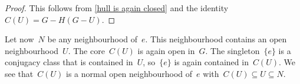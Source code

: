\begin{proof}
	This  follows from \cref{hull is again closed} and the identity~$C(U) = G - H(G - U)$.
\end{proof}

Let now~$N$ be any neighbourhood of~$e$.
This neighbourhood contains an open neighbourhood~$U$.
The core~$C(U)$ is again open in~$G$.
The singleton~$\{ e \}$ is a conjugacy class that is contained in~$U$, so~$\{ e \}$ is again contained in~$C(U)$.
We see that~$C(U)$ is a normal open neighbourhood of~$e$ with~$C(U) ⊆ U ⊆ N$.
